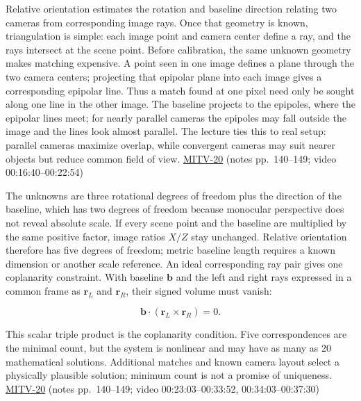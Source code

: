 Relative orientation estimates the rotation and baseline direction relating two cameras from corresponding image rays. Once that geometry is known, triangulation is simple: each image point and camera center define a ray, and the rays intersect at the scene point. Before calibration, the same unknown geometry makes matching expensive. A point seen in one image defines a plane through the two camera centers; projecting that epipolar plane into each image gives a corresponding epipolar line. Thus a match found at one pixel need only be sought along one line in the other image. The baseline projects to the epipoles, where the epipolar lines meet; for nearly parallel cameras the epipoles may fall outside the image and the lines look almost parallel. The lecture ties this to real setup: parallel cameras maximize overlap, while convergent cameras may suit nearer objects but reduce common field of view. \hyperref[04-visual-computing-ii-ch036-mitv-20---space-of-rotations-regular-tessellations-critical-surfaces-binocular-stereo]{MITV-20} (notes pp.~140--149; video 00:16:40--00:22:54)

The unknowns are three rotational degrees of freedom plus the direction of the baseline, which has two degrees of freedom because monocular perspective does not reveal absolute scale. If every scene point and the baseline are multiplied by the same positive factor, image ratios \(X/Z\) stay unchanged. Relative orientation therefore has five degrees of freedom; metric baseline length requires a known dimension or another scale reference. An ideal corresponding ray pair gives one coplanarity constraint. With baseline \(\mathbf{b}\) and the left and right rays expressed in a common frame as \(\mathbf{r}_L\) and \(\mathbf{r}_R\), their signed volume must vanish:

\[
\mathbf{b}\cdot(\mathbf{r}_L\times\mathbf{r}_R)=0.
\]

This scalar triple product is the coplanarity condition. Five correspondences are the minimal count, but the system is nonlinear and may have as many as 20 mathematical solutions. Additional matches and known camera layout select a physically plausible solution; minimum count is not a promise of uniqueness. \hyperref[04-visual-computing-ii-ch036-mitv-20---space-of-rotations-regular-tessellations-critical-surfaces-binocular-stereo]{MITV-20} (notes pp.~140--149; video 00:23:03--00:33:52, 00:34:03--00:37:30)

